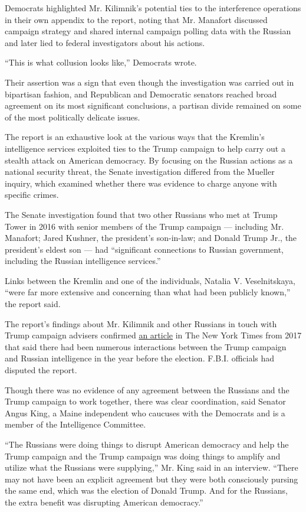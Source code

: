 Democrats highlighted Mr. Kilimnik's potential ties to the interference
operations in their own appendix to the report, noting that Mr. Manafort
discussed campaign strategy and shared internal campaign polling data
with the Russian and later lied to federal investigators about his
actions.

``This is what collusion looks like,'' Democrats wrote.

Their assertion was a sign that even though the investigation was
carried out in bipartisan fashion, and Republican and Democratic
senators reached broad agreement on its most significant conclusions, a
partisan divide remained on some of the most politically delicate
issues.

The report is an exhaustive look at the various ways that the Kremlin's
intelligence services exploited ties to the Trump campaign to help carry
out a stealth attack on American democracy. By focusing on the Russian
actions as a national security threat, the Senate investigation differed
from the Mueller inquiry, which examined whether there was evidence to
charge anyone with specific crimes.

The Senate investigation found that two other Russians who met at Trump
Tower in 2016 with senior members of the Trump campaign --- including
Mr. Manafort; Jared Kushner, the president's son-in-law; and Donald
Trump Jr., the president's eldest son --- had ``significant connections
to Russian government, including the Russian intelligence services.''

Links between the Kremlin and one of the individuals, Natalia V.
Veselnitskaya, ``were far more extensive and concerning than what had
been publicly known,'' the report said.

The report's findings about Mr. Kilimnik and other Russians in touch
with Trump campaign advisers confirmed
\href{https://www.nytimes3xbfgragh.onion/2017/02/14/us/politics/russia-intelligence-communications-trump.html}{an
article} in The New York Times from 2017 that said there had been
numerous interactions between the Trump campaign and Russian
intelligence in the year before the election. F.B.I. officials had
disputed the report.

Though there was no evidence of any agreement between the Russians and
the Trump campaign to work together, there was clear coordination, said
Senator Angus King, a Maine independent who caucuses with the Democrats
and is a member of the Intelligence Committee.

``The Russians were doing things to disrupt American democracy and help
the Trump campaign and the Trump campaign was doing things to amplify
and utilize what the Russians were supplying,'' Mr. King said in an
interview. ``There may not have been an explicit agreement but they were
both consciously pursing the same end, which was the election of Donald
Trump. And for the Russians, the extra benefit was disrupting American
democracy.''

